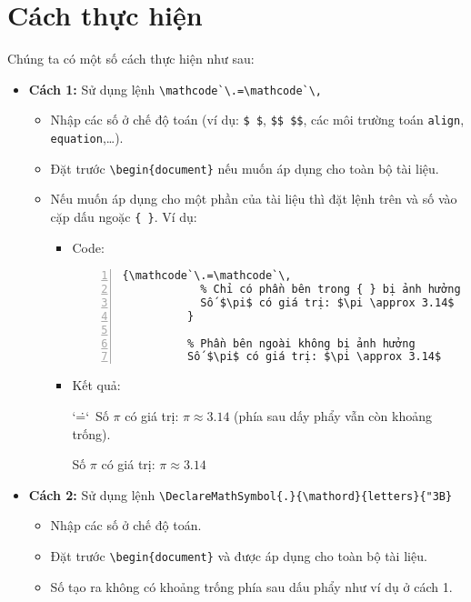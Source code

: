 \documentclass[12pt,a4paper]{article}
\begin{document}
\section{Cách thực hiện}
Chúng ta có một số cách thực hiện như sau:
\begin{itemize}
\item \textbf{Cách 1:} Sử dụng lệnh \Verb|\mathcode`\.=\mathcode`\,|
\begin{itemize}
\item Nhập các số ở chế độ toán (ví dụ: \Verb|$ $|,  \Verb|$$ $$|, các môi trường toán \Verb|align|, \Verb|equation|,\ldots).
\item Đặt trước \Verb|\begin{document}| nếu muốn áp dụng cho toàn bộ tài liệu.

\item Nếu muốn áp dụng cho một phần của tài liệu thì đặt lệnh trên và số vào cặp dấu ngoặc \Verb|{ }|. Ví dụ:
\begin{itemize}
  \item Code:
        \begin{Verbatim}[xleftmargin=10mm, numbers=left]
          {\mathcode`\.=\mathcode`\,
            % Chỉ có phần bên trong { } bị ảnh hưởng
            Số $\pi$ có giá trị: $\pi \approx 3.14$
          }

          % Phần bên ngoài không bị ảnh hưởng
          Số $\pi$ có giá trị: $\pi \approx 3.14$
        \end{Verbatim}

  \item Kết quả:

        {\mathcode`\.=\mathcode`\,
        Số $\pi$ có giá trị: $\pi \approx 3.14$ (phía sau dấy phẩy vẫn còn khoảng trống).
        }

        Số $\pi$ có giá trị: $\pi \approx 3.14$

\end{itemize}
\end{itemize}
\item \textbf{Cách 2:} Sử dụng lệnh \Verb|\DeclareMathSymbol{.}{\mathord}{letters}{"3B}|
\begin{itemize}
\item Nhập các số ở chế độ toán.

\item Đặt trước \Verb|\begin{document}| và được áp dụng cho toàn bộ tài liệu.

\item Số tạo ra không có khoảng trống phía sau dấu phẩy như ví dụ ở cách 1.
\end{itemize}


\end{itemize}
\end{document}
